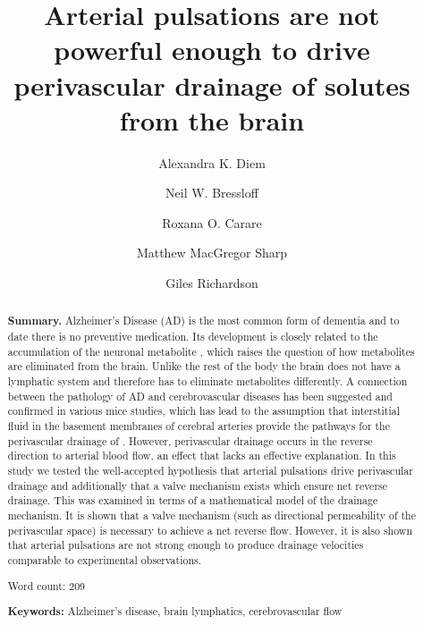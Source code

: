 \documentclass[a4paper,titlepage]{scrartcl}
\begin{document}




\title{Arterial pulsations are not powerful enough to drive perivascular drainage of solutes from the brain}
\author[1,2]{Alexandra K. Diem}
\author[2]{Neil W. Bressloff}
\author[3]{Roxana O. Carare}
\author[3]{Matthew MacGregor Sharp}
\author[4]{Giles Richardson}

\maketitle

\begin{abstract}
\textbf{Summary.} Alzheimer's Disease (AD) is the most common form of dementia and to date there is no preventive medication. Its development is closely related to the accumulation of the neuronal metabolite \Ab, which raises the question of how metabolites are eliminated from the brain. Unlike the rest of the body the brain does not have a lymphatic system and therefore has to eliminate metabolites differently. A connection between the pathology of AD and cerebrovascular diseases has been suggested and confirmed in various mice studies, which has lead to the assumption that interstitial fluid in the basement membranes of cerebral arteries provide the pathways for the perivascular drainage of \Ab. However, perivascular drainage occurs in the reverse direction to arterial blood flow, an effect that lacks an effective explanation. In this study we tested the well-accepted hypothesis that arterial pulsations drive perivascular drainage and additionally that a valve mechanism exists which ensure net reverse drainage. This was examined in terms of a  mathematical model of the  drainage mechanism. It is shown that a valve mechanism (such as directional permeability of the perivascular space) is necessary to achieve a net reverse flow. However, it is also shown that arterial pulsations are not strong enough to produce drainage velocities comparable to experimental observations. %

Word count: 209

\vspace{1cm}

\textbf{Keywords:} Alzheimer's disease, brain lymphatics, cerebrovascular flow
\end{abstract}
\end{document}
